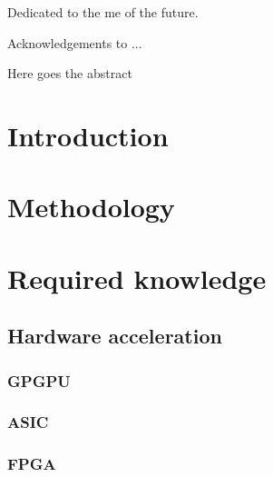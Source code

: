 \documentclass{iccmemoria}
\author{Erik Regla}
\date{month, year}
\begin{document}
\maketitle

\begin{dedicatory}
Dedicated to the me of the future. %
\end{dedicatory}

\begin{acknowledgment}
Acknowledgements to ...
\end{acknowledgment}

\tableofcontents
\listoffigures
\listoftables

\begin{resumen}
Here goes the abstract
\end{resumen}



\chapter{Introduction}
  

\chapter{Methodology}
   
  
\chapter{Required knowledge}
  
  
  
  \section{Hardware acceleration}
    \subsection{GPGPU}
    \subsection{ASIC}
    \subsection{FPGA}
\end{document}
